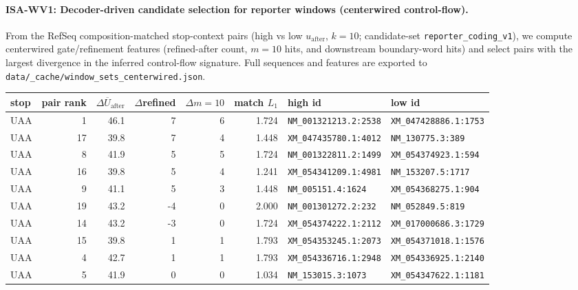 \paragraph{ISA-WV1: Decoder-driven candidate selection for reporter windows (centerwired control-flow).}
From the RefSeq composition-matched stop-context pairs (high vs low $u_{\mathrm{after}}$, $k=10$; candidate-set \texttt{reporter\_coding\_v1}), we compute centerwired gate/refinement features (refined-after count, $m=10$ hits, and downstream boundary-word hits) and select pairs with the largest divergence in the inferred control-flow signature. Full sequences and features are exported to \texttt{data/\_cache/window\_sets\_centerwired.json}.

\begin{center}
\scriptsize
\setlength{\tabcolsep}{5pt}
\renewcommand{\arraystretch}{1.10}
\begin{tabular}{l r r r r r l l}
\toprule
stop & pair rank & $\Delta\overline{U}_{\mathrm{after}}$ & $\Delta$refined & $\Delta m{=}10$ & match $L_1$ & high id & low id \\
\midrule
$\mathrm{UAA}$ & 1 & 46.1 & 7 & 6 & 1.724 & \texttt{NM\_001321213.2:2538} & \texttt{XM\_047428886.1:1753} \\
$\mathrm{UAA}$ & 17 & 39.8 & 7 & 4 & 1.448 & \texttt{XM\_047435780.1:4012} & \texttt{NM\_130775.3:389} \\
$\mathrm{UAA}$ & 8 & 41.9 & 5 & 5 & 1.724 & \texttt{NM\_001322811.2:1499} & \texttt{XM\_054374923.1:594} \\
$\mathrm{UAA}$ & 16 & 39.8 & 5 & 4 & 1.241 & \texttt{XM\_054341209.1:4981} & \texttt{NM\_153207.5:1717} \\
$\mathrm{UAA}$ & 9 & 41.1 & 5 & 3 & 1.448 & \texttt{NM\_005151.4:1624} & \texttt{XM\_054368275.1:904} \\
$\mathrm{UAA}$ & 19 & 43.2 & -4 & 0 & 2.000 & \texttt{NM\_001301272.2:232} & \texttt{NM\_052849.5:819} \\
$\mathrm{UAA}$ & 14 & 43.2 & -3 & 0 & 1.724 & \texttt{XM\_054374222.1:2112} & \texttt{XM\_017000686.3:1729} \\
$\mathrm{UAA}$ & 15 & 39.8 & 1 & 1 & 1.793 & \texttt{XM\_054353245.1:2073} & \texttt{XM\_054371018.1:1576} \\
$\mathrm{UAA}$ & 4 & 42.7 & 1 & 1 & 1.793 & \texttt{XM\_054336716.1:2948} & \texttt{XM\_054336925.1:2140} \\
$\mathrm{UAA}$ & 5 & 41.9 & 0 & 0 & 1.034 & \texttt{NM\_153015.3:1073} & \texttt{XM\_054347622.1:1181} \\

\end{tabular}
\end{center}
